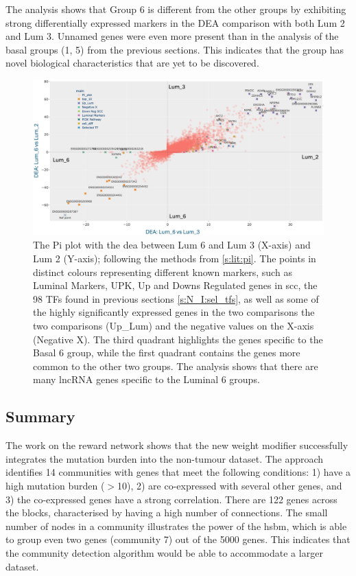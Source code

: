 The analysis shows that Group 6 is different from the other groups by exhibiting strong differentially expressed markers in the DEA comparison with both Lum 2 and Lum 3. Unnamed genes were even more present than in the analysis of the basal groups (1, 5) from the previous sections. This indicates that the group has novel biological characteristics that are yet to be discovered.


\begin{figure}  
    \centering
    \includegraphics[width=1.0\textwidth,height=1.0\textheight,keepaspectratio]{Sections/Network_II/resources/reward/PI_Lum_6.png}
    \caption[Pi plot highlighting the properties for Lum 6]{The Pi plot with the \acrfull{dea} between Lum 6 and Lum 3 (X-axis) and Lum 2 (Y-axis); following the methods from \cref{s:lit:pi}. The points in distinct colours representing different known markers, such as Luminal Markers, UPK, Up and Downs Regulated genes in \acrlong{scc}, the 98 TFs found in previous sections \cref{s:N_I:sel_tfs}, as well as some of the highly significantly expressed genes in the two comparisons the two comparisons (Up\_Lum) and the negative values on the X-axis (Negative X). The third quadrant highlights the genes specific to the Basal 6 group, while the first quadrant contains the genes more common to the other two groups. The analysis shows that there are many \acrshort{lncRNA} genes specific to the Luminal 6 groups.}
    \label{fig:N_II:pi_lum_6}
\end{figure}


\subsection{Summary}


The work on the reward network shows that the new weight modifier successfully integrates the mutation burden into the non-tumour dataset. The approach identifies 14 communities with genes that meet the following conditions: 1) have a high mutation burden ($>$10), 2) are co-expressed with several other genes, and 3) the co-expressed genes have a strong correlation. There are 122 genes across the blocks, characterised by having a high number of connections. The small number of nodes in a community illustrates the power of the \acrlong{hsbm}, which is able to group even two genes (community 7) out of the 5000 genes. This indicates that the community detection algorithm would be able to accommodate a larger dataset.

